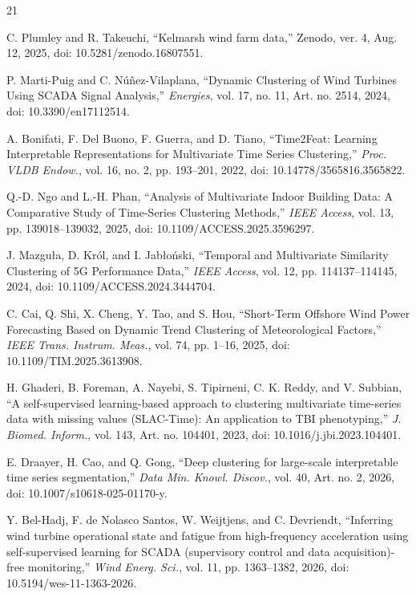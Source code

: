 \documentclass[conference]{IEEEtran}
\begin{document}
\begin{thebibliography}{21}

C. Plumley and R. Takeuchi, ``Kelmarsh wind farm data,'' Zenodo, ver. 4, Aug. 12, 2025, doi: 10.5281/zenodo.16807551.

P. Marti-Puig and C. N{\'u}{\~n}ez-Vilaplana, ``Dynamic Clustering of Wind Turbines Using SCADA Signal Analysis,'' \textit{Energies}, vol. 17, no. 11, Art. no. 2514, 2024, doi: 10.3390/en17112514.

A. Bonifati, F. Del Buono, F. Guerra, and D. Tiano, ``Time2Feat: Learning Interpretable Representations for Multivariate Time Series Clustering,'' \textit{Proc. VLDB Endow.}, vol. 16, no. 2, pp. 193--201, 2022, doi: 10.14778/3565816.3565822.

Q.-D. Ngo and L.-H. Phan, ``Analysis of Multivariate Indoor Building Data: A Comparative Study of Time-Series Clustering Methods,'' \textit{IEEE Access}, vol. 13, pp. 139018--139032, 2025, doi: 10.1109/ACCESS.2025.3596297.

J. Mazgu{\l}a, D. Kr{\'o}l, and I. Jab{\l}o{\'n}ski, ``Temporal and Multivariate Similarity Clustering of 5G Performance Data,'' \textit{IEEE Access}, vol. 12, pp. 114137--114145, 2024, doi: 10.1109/ACCESS.2024.3444704.

C. Cai, Q. Shi, X. Cheng, Y. Tao, and S. Hou, ``Short-Term Offshore Wind Power Forecasting Based on Dynamic Trend Clustering of Meteorological Factors,'' \textit{IEEE Trans. Instrum. Meas.}, vol. 74, pp. 1--16, 2025, doi: 10.1109/TIM.2025.3613908.

H. Ghaderi, B. Foreman, A. Nayebi, S. Tipirneni, C. K. Reddy, and V. Subbian, ``A self-supervised learning-based approach to clustering multivariate time-series data with missing values (SLAC-Time): An application to TBI phenotyping,'' \textit{J. Biomed. Inform.}, vol. 143, Art. no. 104401, 2023, doi: 10.1016/j.jbi.2023.104401.

E. Draayer, H. Cao, and Q. Gong, ``Deep clustering for large-scale interpretable time series segmentation,'' \textit{Data Min. Knowl. Discov.}, vol. 40, Art. no. 2, 2026, doi: 10.1007/s10618-025-01170-y.

Y. Bel-Hadj, F. de Nolasco Santos, W. Weijtjens, and C. Devriendt, ``Inferring wind turbine operational state and fatigue from high-frequency acceleration using self-supervised learning for SCADA (supervisory control and data acquisition)-free monitoring,'' \textit{Wind Energ. Sci.}, vol. 11, pp. 1363--1382, 2026, doi: 10.5194/wes-11-1363-2026.


\end{thebibliography}
\end{document}
